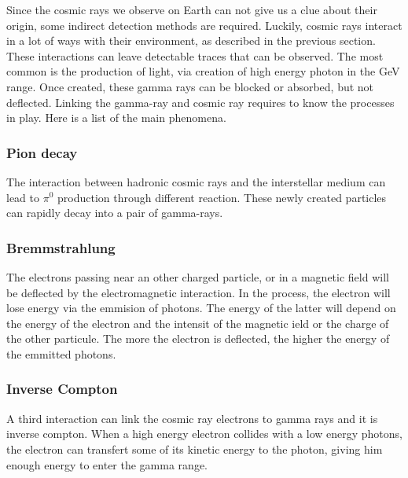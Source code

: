 Since the cosmic rays we observe on Earth can not give us a clue about their origin, some indirect detection methods are required. Luckily, cosmic rays interact in a lot of ways with their environment, as described in the previous section. These interactions can leave detectable traces that can be observed. The most common is the production of light, via creation of high energy photon in the GeV range. Once created, these gamma rays can be blocked or absorbed, but not deflected. Linking the gamma-ray and cosmic ray requires to know the processes in play. Here is a list of the main phenomena.

\subsubsection{Pion decay}


The interaction between hadronic cosmic rays and the interstellar medium can lead to $\pi^0$ production through different reaction. These newly created  particles can rapidly decay into a pair of gamma-rays.



\subsubsection{Bremmstrahlung}


The electrons passing near an other charged particle, or in a magnetic field will be deflected by the electromagnetic interaction. In the process, the electron will lose energy via the emmision of photons. The energy of the latter will depend on the energy of the electron and the intensit of the magnetic ield or the charge of the other particule. The more the electron is deflected, the higher the energy of the emmitted photons.


\subsubsection{Inverse Compton}


A third interaction can link the cosmic ray electrons to gamma rays and it is inverse compton. When a high energy electron collides with a low energy photons, the electron can transfert some of its kinetic energy to the photon, giving him enough energy to enter the gamma range.

